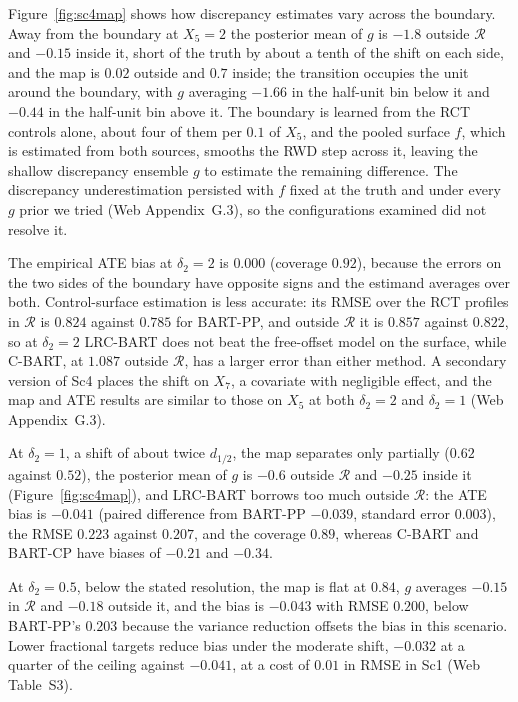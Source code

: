 Figure~\ref{fig:sc4map} shows how discrepancy estimates vary across the boundary. Away from the boundary at $X_5=2$ the posterior mean of $g$ is $-1.8$ outside $\mathcal R$ and $-0.15$ inside it, short of the truth by about a tenth of the shift on each side, and the map is $0.02$ outside and $0.7$ inside; the transition occupies the unit around the boundary, with $g$ averaging $-1.66$ in the half-unit bin below it and $-0.44$ in the half-unit bin above it. The boundary is learned from the RCT controls alone, about four of them per $0.1$ of $X_5$, and the pooled surface $f$, which is estimated from both sources, smooths the RWD step across it, leaving the shallow discrepancy ensemble $g$ to estimate the remaining difference. The discrepancy underestimation persisted with $f$ fixed at the truth and under every $g$ prior we tried (Web Appendix~G.3), so the configurations examined did not resolve it.

The empirical ATE bias at $\delta_2=2$ is $0.000$ (coverage $0.92$), because the errors on the two sides of the boundary have opposite signs and the estimand averages over both. Control-surface estimation is less accurate: its RMSE over the RCT profiles in $\mathcal R$ is $0.824$ against $0.785$ for BART-PP, and outside $\mathcal R$ it is $0.857$ against $0.822$, so at $\delta_2=2$ LRC-BART does not beat the free-offset model on the surface, while C-BART, at $1.087$ outside $\mathcal R$, has a larger error than either method. A secondary version of Sc4 places the shift on $X_7$, a covariate with negligible effect, and the map and ATE results are similar to those on $X_5$ at both $\delta_2=2$ and $\delta_2=1$ (Web Appendix~G.3).

At $\delta_2=1$, a shift of about twice $d_{1/2}$, the map separates only partially ($0.62$ against $0.52$), the posterior mean of $g$ is $-0.6$ outside $\mathcal R$ and $-0.25$ inside it (Figure~\ref{fig:sc4map}), and LRC-BART borrows too much outside $\mathcal R$: the ATE bias is $-0.041$ (paired difference from BART-PP $-0.039$, standard error $0.003$), the RMSE $0.223$ against $0.207$, and the coverage $0.89$, whereas C-BART and BART-CP have biases of $-0.21$ and $-0.34$.

At $\delta_2=0.5$, below the stated resolution, the map is flat at $0.84$, $g$ averages $-0.15$ in $\mathcal R$ and $-0.18$ outside it, and the bias is $-0.043$ with RMSE $0.200$, below BART-PP's $0.203$ because the variance reduction offsets the bias in this scenario. Lower fractional targets reduce bias under the moderate shift, $-0.032$ at a quarter of the ceiling against $-0.041$, at a cost of $0.01$ in RMSE in Sc1 (Web Table~S3).

